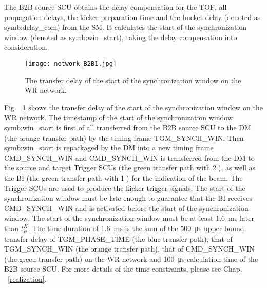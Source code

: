 The B2B source SCU obtains the delay compensation for the TOF, all propagation delays, the kicker preparation time and the bucket delay (denoted as \gls{symb:delay_com}) from the SM. It calculates the start of the synchronization window (denoted as \gls{symb:win_start}), taking the delay compensation into consideration. 

 \begin{figure}[!htb]
   \centering   
   \texttt{[image: network\_B2B1.jpg]}
   \caption{The transfer delay of the start of the synchronization window on the WR network.}
   \label{network_B2B1}
\end{figure}
Fig. ~\ref{network_B2B1} shows the transfer delay of the start of the synchronization window on the WR network. The timestamp of the start of the synchronization window \gls{symb:win_start} is first of all transferred from the B2B source SCU to the DM (the orange transfer path) by the timing frame TGM\_SYNCH\_WIN. Then \gls{symb:win_start} is repackaged by the DM into a new timing frame CMD\_SYNCH\_WIN and CMD\_SYNCH\_WIN is transferred from the DM to the source and target Trigger SCUs  (the green transfer path with \textcircled{2}), as well as the BI (the green transfer path with \textcircled{1}) for the indication of the beam. The Trigger SCUs are used to produce the kicker trigger signals. The start of the synchronization window must be late enough to guarantee that the BI receives CMD\_SYNCH\_WIN and is activated before the start of the synchronization window. The start of the synchronization window must be at least \SI{1.6}{\ms} later than $t_\psi^\mathit{X}$. The time duration of \SI{1.6}{\ms} is the sum of the \SI{500}{\us} upper bound transfer delay of TGM\_PHASE\_TIME (the blue transfer path), that of TGM\_SYNCH\_WIN (the orange transfer path), that of CMD\_SYNCH\_WIN (the green transfer path) on the WR network and \SI{100}{\us} calculation time of the B2B source SCU. For more details of the time constraints, please see Chap. ~\ref{realization}.

